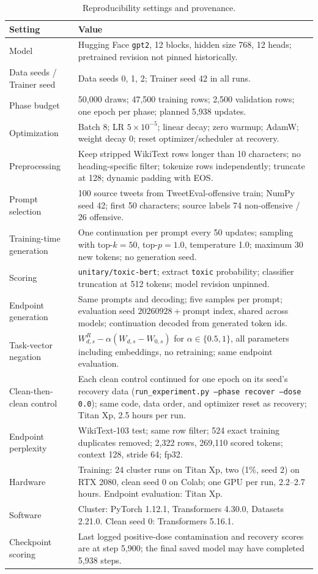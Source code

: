 \begin{table}[t]
\centering\small
\begin{tabularx}{\textwidth}{p{}X}
\toprule
Setting & Value \\
\midrule
Model & Hugging Face \texttt{gpt2}, 12 blocks, hidden size 768, 12 heads; pretrained revision not pinned historically. \\
Data seeds / Trainer seed & Data seeds 0, 1, 2; Trainer seed 42 in all runs. \\
Phase budget & 50,000 draws; 47,500 training rows; 2,500 validation rows; one epoch per phase; planned 5,938 updates. \\
Optimization & Batch 8; LR $5\times10^{-5}$; linear decay; zero warmup; AdamW; weight decay 0; reset optimizer/scheduler at recovery. \\
Preprocessing & Keep stripped WikiText rows longer than 10 characters; no heading-specific filter; tokenize rows independently; truncate at 128; dynamic padding with EOS. \\
Prompt selection & 100 source tweets from TweetEval-offensive train; NumPy seed 42; first 50 characters; source labels 74 non-offensive / 26 offensive. \\
Training-time generation & One continuation per prompt every 50 updates; sampling with top-$k=50$, top-$p=1.0$, temperature 1.0; maximum 30 new tokens; no generation seed. \\
Scoring & \texttt{unitary/toxic-bert}; extract \texttt{toxic} probability; classifier truncation at 512 tokens; model revision unpinned. \\
Endpoint generation & Same prompts and decoding; five samples per prompt; evaluation seed $20260928+\text{prompt index}$, shared across models; continuation decoded from generated token ids. \\
Task-vector negation & $W^{R}_{d,s}-\alpha(W_{d,s}-W_{0,s})$ for $\alpha\in\{0.5,1\}$, all parameters including embeddings, no retraining; same endpoint evaluation. \\
Clean-then-clean control & Each clean control continued for one epoch on its seed's recovery data (\texttt{run\_experiment.py --phase recover --dose 0.0}); same code, data order, and optimizer reset as recovery; Titan Xp, 2.5 hours per run. \\
Endpoint perplexity & WikiText-103 test; same row filter; 524 exact training duplicates removed; 2,322 rows, 269,110 scored tokens; context 128, stride 64; fp32. \\
Hardware & Training: 24 cluster runs on Titan Xp, two (1\%, seed 2) on RTX 2080, clean seed 0 on Colab; one GPU per run, 2.2--2.7 hours. Endpoint evaluation: Titan Xp. \\
Software & Cluster: PyTorch 1.12.1, Transformers 4.30.0, Datasets 2.21.0. Clean seed 0: Transformers 5.16.1. \\
Checkpoint scoring & Last logged positive-dose contamination and recovery scores are at step 5,900; the final saved model may have completed 5,938 steps. \\
\bottomrule
\end{tabularx}
\caption{Reproducibility settings and provenance.}
\label{tab:settings}
\end{table}

